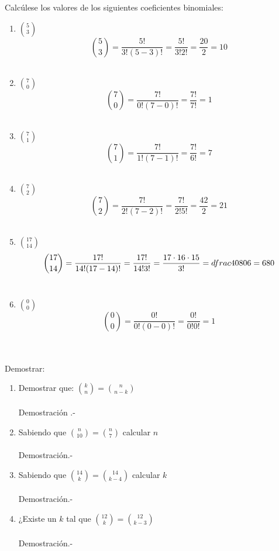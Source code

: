 \begin{ej}
Calcúlese los valores de los siguientes coeficientes binomiales:
\begin{enumerate}[\bfseries a)]
\item ${5 \choose 3}$
$${5 \choose 3} = \dfrac{5!}{3! (5-3)!} = \dfrac{5!}{3! 2!} = \dfrac{20}{2} = 10$$ \\

\item ${7 \choose 0}$
$${7 \choose 0} = \dfrac{7!}{0!(7-0)!} = \dfrac{7!}{7!} = 1$$ \\

\item ${7 \choose 1}$
$${7 \choose 1} = \dfrac{7!}{1!(7-1)!} = \dfrac{7!}{6!} = 7$$ \\

\item ${7 \choose 2}$
$${7 \choose 2} = \dfrac{7!}{2!(7-2)!} = \dfrac{7!}{2!5!} = \dfrac{42}{2} = 21$$ \\

\item ${17 \choose 14}$
$${17 \choose 14} = \dfrac{17!}{14!(17-14)!} = \dfrac{17!}{14!3!} = \dfrac{17 \cdot 16 \cdot 15}{3!} = \\dfrac{4080}{6} = 680$$\\

\item ${0\choose 0}$
$${0\choose 0}=\dfrac{0!}{0!(0-0)!}=\dfrac{0!}{0!0!} = 1$$\\\\
\end{enumerate}
\end{ej}
	
\begin{teo}Demostrar:
\begin{enumerate}[\bfseries a)]
\item Demostrar que: ${k \choose n} = {n \choose n-k}$\\\\
Demostración .- \; 

\item Sabiendo que ${n \choose 10} = {n \choose 7}$ calcular $n$\\\\
Demostración.- \; 

\item Sabiendo que ${14 \choose k} = {14 \choose k-4}$ calcular $k$\\\\
Demostración.- \; 

\item ¿Existe un $k$ tal que ${12 \choose k} = {12 \choose k-3 }$\\\\
Demostración.- \;
\end{enumerate}

\end{teo}

